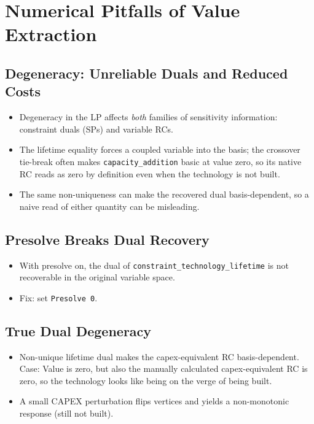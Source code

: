 \section{Numerical Pitfalls of Value Extraction}
\label{app:problems}

\subsection{Degeneracy: Unreliable Duals and Reduced Costs}
\label{app:problem1}
\begin{itemize}
	\item Degeneracy in the LP affects \emph{both} families of sensitivity
	information: constraint duals (\aclp{SP}) and variable \aclp{RC}.
	\item The lifetime equality forces a coupled variable into the basis; the
	crossover tie-break often makes \texttt{capacity\_addition} basic at value
	zero, so its native \ac{RC} reads as zero by definition even when the
	technology is not built.
	\item The same non-uniqueness can make the recovered dual basis-dependent,
	so a naive read of either quantity can be misleading.
\end{itemize}

\subsection{Presolve Breaks Dual Recovery}
\label{app:problem2}
\begin{itemize}
	\item With presolve on, the dual of \texttt{constraint\_technology\_lifetime}
	is not recoverable in the original variable space.
	\item Fix: set \texttt{Presolve 0}.
\end{itemize}

\subsection{True Dual Degeneracy}
\label{app:problem3}
\begin{itemize}
	\item Non-unique lifetime dual makes the capex-equivalent \ac{RC}
	basis-dependent. Case: Value is zero, but also the manually calculated capex-equivalent \ac{RC} is zero, so the technology looks like being on the verge of being built.
	\item A small \ac{CAPEX} perturbation flips vertices and yields a non-monotonic response (still not built).
\end{itemize}

